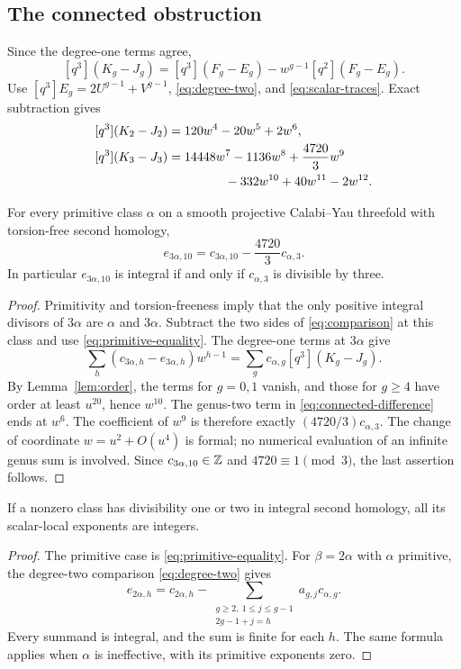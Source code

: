 \subsection{The connected obstruction}
Since the degree-one terms agree,
\begin{equation}\label{eq:log-three}
 [q^3](K_g-J_g)
 =[q^3](F_g-E_g)-w^{g-1}[q^2](F_g-E_g).
\end{equation}
Use $[q^3]E_g=2U^{g-1}+V^{g-1}$, \eqref{eq:degree-two}, and
\eqref{eq:scalar-traces}. Exact subtraction gives
\begin{equation}\label{eq:connected-difference}
 \begin{split}
 [q^3](K_2-J_2)&=120w^4-20w^5+2w^6,\\
 [q^3](K_3-J_3)&=14448w^7-1136w^8+\frac{4720}{3}w^9\\
 &\hspace{16mm}-332w^{10}+40w^{11}-2w^{12}.
 \end{split}
\end{equation}

\begin{proposition}\label{prop:congruence}
For every primitive class $\alpha$ on a smooth projective
Calabi--Yau threefold with torsion-free second homology,
\[
 e_{3\alpha,10}=c_{3\alpha,10}-\frac{4720}{3}c_{\alpha,3}.
\]
In particular $e_{3\alpha,10}$ is integral if and only if
$c_{\alpha,3}$ is divisible by three.
\end{proposition}
\begin{proof}
Primitivity and torsion-freeness imply that the only positive integral
divisors of $3\alpha$ are $\alpha$ and $3\alpha$. Subtract the two
sides of \eqref{eq:comparison} at this class and use
\eqref{eq:primitive-equality}. The degree-one terms at $3\alpha$
give
\[
 \sum_h(c_{3\alpha,h}-e_{3\alpha,h})w^{h-1}
 =\sum_g c_{\alpha,g}[q^3](K_g-J_g).
\]
By Lemma~\ref{lem:order}, the terms for $g=0,1$ vanish, and those
for $g\ge4$ have order at least $u^{20}$, hence $w^{10}$.
The genus-two term in \eqref{eq:connected-difference} ends at
$w^6$. The coefficient of $w^9$ is therefore exactly
$(4720/3)c_{\alpha,3}$. The change of coordinate
$w=u^2+O(u^4)$ is formal; no numerical evaluation of an infinite
genus sum is involved. Since $c_{3\alpha,10}\in\mathbb Z$ and
$4720\equiv1\pmod3$, the last assertion follows.
\end{proof}

\begin{corollary}\label{cor:small-divisibility}
If a nonzero class has divisibility one or two in integral second
homology, all its scalar-local exponents are integers.
\end{corollary}
\begin{proof}
The primitive case is \eqref{eq:primitive-equality}. For
$\beta=2\alpha$ with $\alpha$ primitive, the degree-two comparison
\eqref{eq:degree-two} gives
\[
 e_{2\alpha,h}=c_{2\alpha,h}
 -\sum_{\substack{g\ge2,\ 1\le j\le g-1\\2g-1+j=h}}
 a_{g,j}c_{\alpha,g}.
\]
Every summand is integral, and the sum is finite for each $h$.
The same formula applies when $\alpha$ is ineffective, with its
primitive exponents zero.
\end{proof}
